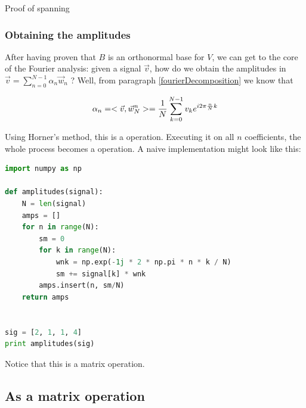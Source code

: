 Proof of spanning

\subsubsection{Obtaining the amplitudes}
After having proven that $B$ is an orthonormal base for $V$, we can get to the core of the Fourier analysis:
given a signal $\vec{v}$, how do we obtain the amplitudes in $\vec{v} = \sum_{n=0}^{N-1} \alpha_n \vec{w}_n$ ?
Well, from paragraph \ref{fourierDecomposition} we know that 

$$ \alpha_n = < \vec{v} , \vec{w}_N^n > = \frac{1}{N} \sum_{k=0}^{N-1} v_k e^{i 2\pi \frac{n}{N} k} $$

Using Horner's method, this is a  operation.
Executing it on all $n$ coefficients, the whole process becomes a  operation.
A naive implementation might look like this: 

\begin{lstlisting}[language=python]
import numpy as np

def amplitudes(signal):
    N = len(signal)
    amps = []
    for n in range(N):
        sm = 0
        for k in range(N):
            wnk = np.exp(-1j * 2 * np.pi * n * k / N) 
            sm += signal[k] * wnk
        amps.insert(n, sm/N)
    return amps


sig = [2, 1, 1, 4]
print amplitudes(sig)
\end{lstlisting}

Notice that this is a matrix operation. 


\subsection{As a matrix operation}

